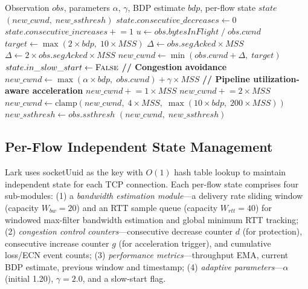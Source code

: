 \documentclass[10pt,twocolumn]{article}
\begin{document}
\begin{algorithm}[htbp]
\caption{Hybrid Rate--Window Fusion Control}
\label{alg:fusion}
\small
\begin{algorithmic}[1]
\REQUIRE Observation $obs$, parameters $\alpha$, $\gamma$, BDP estimate $bdp$, per-flow state $state$
\ENSURE $(new\_cwnd, \; new\_ssthresh)$
\STATE $state.consecutive\_decreases \leftarrow 0$ 
\STATE $state.consecutive\_increases \mathrel{+}= 1$
\STATE $u \leftarrow obs.bytesInFlight \;/\; obs.cwnd$
    \STATE $target \leftarrow \max(2 \times bdp, \; 10 \times MSS)$
    \STATE $\Delta \leftarrow obs.segAcked \times MSS$
        \STATE $\Delta \leftarrow 2 \times obs.segAcked \times MSS$
    \ENDIF
    \STATE $new\_cwnd \leftarrow \min(obs.cwnd + \Delta, \; target)$
        \STATE $state.in\_slow\_start \leftarrow \textsc{False}$
    \ENDIF
\ELSE
    \STATE \textbf{// Congestion avoidance}
    \STATE $new\_cwnd \leftarrow \max(\alpha \times bdp, \; obs.cwnd) + \gamma \times MSS$
\ENDIF
\STATE \textbf{// Pipeline utilization-aware acceleration}
    \STATE $new\_cwnd \mathrel{+}= 1 \times MSS$
\ENDIF
{}
    \STATE $new\_cwnd \mathrel{+}= 2 \times MSS$
\ENDIF
\STATE $new\_cwnd \leftarrow \text{clamp}(new\_cwnd, \; 4 \times MSS, \; \max(10 \times bdp, \; 200 \times MSS))$
\STATE $new\_ssthresh \leftarrow obs.ssthresh$
\RETURN $(new\_cwnd, \; new\_ssthresh)$
\end{algorithmic}
\end{algorithm}

\subsection{Per-Flow Independent State Management}

Lark uses socketUuid as the key with $O(1)$ hash table lookup to maintain independent state for each TCP connection. Each per-flow state comprises four sub-modules: (1) a \textit{bandwidth estimation module}---a delivery rate sliding window (capacity $W_{bw}=20$) and an RTT sample queue (capacity $W_{rtt}=40$) for windowed max-filter bandwidth estimation and global minimum RTT tracking; (2) \textit{congestion control counters}---consecutive decrease counter $d$ (for protection), consecutive increase counter $g$ (for acceleration trigger), and cumulative loss/ECN event counts; (3) \textit{performance metrics}---throughput EMA, current BDP estimate, previous window and timestamp; (4) \textit{adaptive parameters}---$\alpha$ (initial 1.20), $\gamma = 2.0$, and a slow-start flag.
\end{document}
